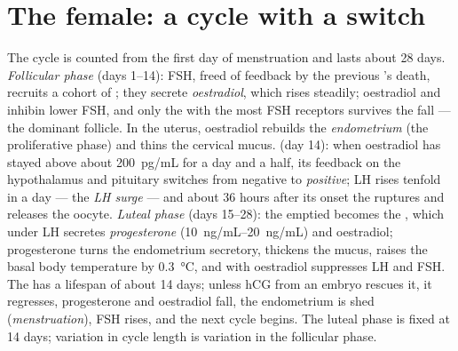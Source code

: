 \section{The female: a cycle with a switch}

\begin{definition}\label{def:b2:reproductive-hormones:cycle}
The cycle is counted from the first day of menstruation and lasts
about 28 days. \emph{Follicular phase} (days 1--14): FSH, freed of
feedback by the previous 's death, recruits a cohort
of ; they secrete \emph{oestradiol}, which rises steadily;
oestradiol and inhibin lower FSH, and only the  with the
most FSH receptors survives the fall --- the dominant follicle. In
the uterus, oestradiol rebuilds the \emph{endometrium} (the
proliferative phase) and thins the cervical mucus. \emph{}
(day 14): when oestradiol has stayed above about \qty{200}{pg/mL}
for a day and a half, its feedback on the hypothalamus and pituitary
switches from negative to \emph{positive}; LH rises tenfold in a day
--- the \emph{LH surge} --- and about 36 hours after its onset the
 ruptures and releases the oocyte. \emph{Luteal phase} (days
15--28): the emptied  becomes the , which
under LH secretes \emph{progesterone} (\qtyrange{10}{20}{ng/mL}) and
oestradiol; progesterone turns the endometrium secretory, thickens
the mucus, raises the basal body temperature by \qty{0.3}{\celsius},
and with oestradiol suppresses LH and FSH. The  has a
lifespan of about 14 days; unless hCG from an embryo rescues it, it
regresses, progesterone and oestradiol fall, the endometrium is shed
(\emph{menstruation}), FSH rises, and the next cycle begins. The
luteal phase is fixed at 14 days; variation in cycle length is
variation in the follicular phase.
\end{definition}

